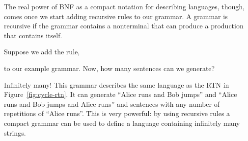 The real power of BNF as a compact notation for describing languages, though, comes once we start adding recursive rules to our grammar.   A grammar is recursive if the grammar contains a nonterminal that can produce a production that contains itself.  

Suppose we add the rule, 
\begin{centernospace}
\end{centernospace}
to our example grammar.  Now, how many sentences can we generate?

Infinitely many!  This grammar describes the same language as the RTN in Figure~\ref{fig:cycle-rtn}.  It can generate ``Alice runs and Bob jumps'' and ``Alice runs and Bob jumps and Alice runs'' and sentences with any number of repetitions of ``Alice runs''.  This is very powerful: by using recursive rules a compact grammar can be used to define a language containing infinitely many strings.

